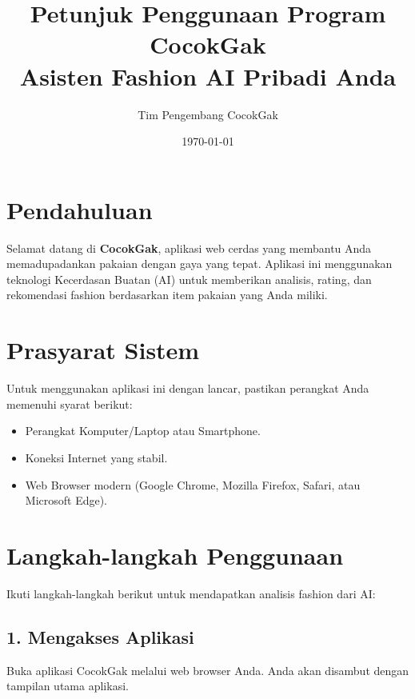 \documentclass[a4paper,12pt]{article}
\title{\textbf{Petunjuk Penggunaan Program CocokGak}\\
\large Asisten Fashion AI Pribadi Anda}
\author{Tim Pengembang CocokGak}
\date{\today}
\begin{document}
\maketitle

\section{Pendahuluan}
Selamat datang di \textbf{CocokGak}, aplikasi web cerdas yang membantu Anda memadupadankan pakaian dengan gaya yang tepat. Aplikasi ini menggunakan teknologi Kecerdasan Buatan (AI) untuk memberikan analisis, rating, dan rekomendasi fashion berdasarkan item pakaian yang Anda miliki.

\section{Prasyarat Sistem}
Untuk menggunakan aplikasi ini dengan lancar, pastikan perangkat Anda memenuhi syarat berikut:
\begin{itemize}
    \item Perangkat Komputer/Laptop atau Smartphone.
    \item Koneksi Internet yang stabil.
    \item Web Browser modern (Google Chrome, Mozilla Firefox, Safari, atau Microsoft Edge).
\end{itemize}

\section{Langkah-langkah Penggunaan}

Ikuti langkah-langkah berikut untuk mendapatkan analisis fashion dari AI:

\subsection{1. Mengakses Aplikasi}
Buka aplikasi CocokGak melalui web browser Anda. Anda akan disambut dengan tampilan utama aplikasi.
\end{document}
